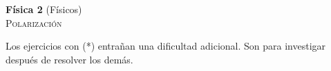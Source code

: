\documentclass[11pt,spanish,a4paper]{article}
\begin{document}
\begin{center}
	\textbf{Física 2} (Físicos) \hfill {}\\
	\textsc{\LARGE Polarización}
\end{center}

Los ejercicios con (*) entrañan una dificultad adicional. Son para investigar después de resolver los demás.


\begin{enumerate}






\end{enumerate}
\end{document}
